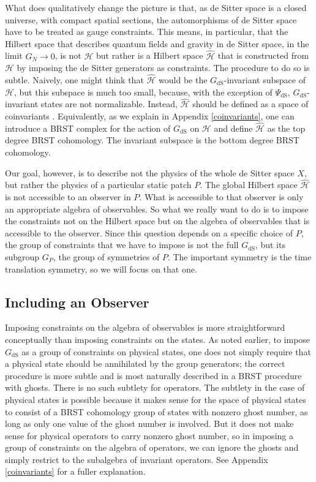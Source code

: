 \documentclass[11pt,a4paper]{article}
\def\h{\widehat}
\def\h{\widehat}
\def\H{{\mathcal H}}
\def\dS{{\mathrm{dS}}}
\begin{document}
What does qualitatively change the picture is that, as de Sitter space is a closed universe, with compact  spatial sections, the automorphisms of de Sitter
space have to be treated as gauge constraints.  This means, in particular, that the Hilbert space that describes quantum fields and gravity in de Sitter space, in the limit
$G_N\to 0$, is not $\H$ but rather is a Hilbert space $\h\H$ that is constructed from $\H$ by imposing the de Sitter generators as constraints.  The procedure to do so
is subtle.
Naively, one might think that $\h\H$ would be the $G_\dS$-invariant subspace of $\H$, but this subspace is much too small, because, with the exception of $\Psi_\dS$,
$G_\dS$-invariant states are not normalizable.  
Instead, $\h\H$ should be defined as a space of coinvariants \cite{higuchi,marolf}.    Equivalently, as we explain in Appendix \ref{coinvariants}, one
can introduce a BRST complex for the action of $G_\dS$ on $\H$
 and define $\h\H$ as the top degree BRST cohomology. The invariant subspace is the bottom
degree BRST cohomology.


Our goal, however, is to describe not the physics of the whole de Sitter space $X$, but rather the physics of a particular static patch $P$.   The global Hilbert space
$\h\H$ is not accessible to an observer in $P$.  What is accessible to that observer is only an appropriate algebra of observables.   So what we really want to do
is to impose the constraints not on the Hilbert space but on the algebra of observables that is accessible to the observer.   Since this question depends on
a specific choice of $P$, the group of constraints that we have to impose is not the full $G_\dS$, but its subgroup $G_P$, the group of symmetries of $P$.
The important symmetry is the time translation symmetry, so we will focus on that one. 

\subsection{Including an Observer}\label{constob}

Imposing  constraints on the algebra of observables is more  straightforward conceptually than imposing constraints on the states.   As noted earlier,
to impose $G_\dS$ as a group of constraints on physical states, one does not simply require 
that a physical state should be annihilated by the group generators; the correct procedure is more subtle and is most naturally described in a BRST procedure with ghosts.  
There is no such subtlety for operators.
The subtlety in the case of physical states is possible because 
 it makes sense for the space of physical states to consist of a BRST cohomology group of states with nonzero ghost number, as long as only
one value of the ghost number is involved.
But it does not make sense 
for physical operators to carry nonzero ghost number, so in imposing a group of constraints on the algebra of operators, we can ignore the ghosts and simply
restrict to the subalgebra of invariant operators.  See Appendix \ref{coinvariants} for a fuller explanation.
\end{document}
